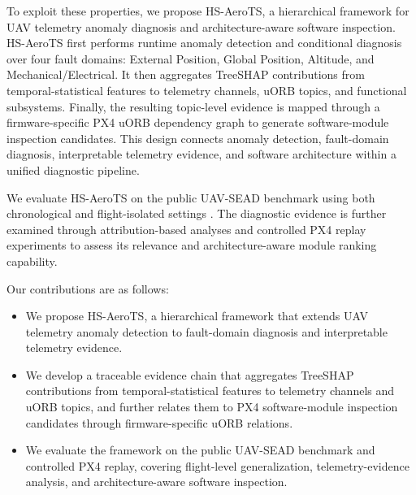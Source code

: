 To exploit these properties, we propose HS-AeroTS, a hierarchical framework for UAV telemetry anomaly diagnosis and architecture-aware software inspection. HS-AeroTS first performs runtime anomaly detection and conditional diagnosis over four fault domains: External Position, Global Position, Altitude, and Mechanical/Electrical. It then aggregates TreeSHAP contributions from temporal-statistical features to telemetry channels, uORB topics, and functional subsystems. Finally, the resulting topic-level evidence is mapped through a firmware-specific PX4 uORB dependency graph to generate software-module inspection candidates. This design connects anomaly detection, fault-domain diagnosis, interpretable telemetry evidence, and software architecture within a unified diagnostic pipeline.

We evaluate HS-AeroTS on the public UAV-SEAD benchmark using both chronological and flight-isolated settings \cite{kabaoglu2026uavsead}. The diagnostic evidence is further examined through attribution-based analyses and controlled PX4 replay experiments to assess its relevance and architecture-aware module ranking capability.

Our contributions are as follows:

\begin{itemize}[leftmargin=*,label=\textbullet]
    \item We propose HS-AeroTS, a hierarchical framework that extends UAV telemetry anomaly detection to fault-domain diagnosis and interpretable telemetry evidence.
    \item We develop a traceable evidence chain that aggregates TreeSHAP contributions from temporal-statistical features to telemetry channels and uORB topics, and further relates them to PX4 software-module inspection candidates through firmware-specific uORB relations.
    \item We evaluate the framework on the public UAV-SEAD benchmark and controlled PX4 replay, covering flight-level generalization, telemetry-evidence analysis, and architecture-aware software inspection.
\end{itemize}
